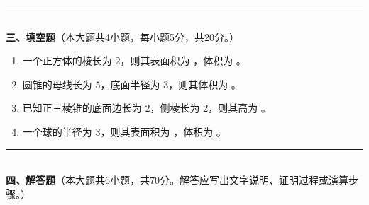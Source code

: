 \documentclass[12pt, a4paper]{ctexart}
\begin{document}
\vspace{6pt}

\noindent\rule{\textwidth}{0.4pt}\\[2pt]
{\large\bfseries 三、填空题}（本大题共4小题，每小题5分，共20分。）

\vspace{6pt}

\begin{enumerate}[resume]
\item 一个正方体的棱长为 $2$，则其表面积为 \underline{\hspace{2cm}}，体积为 \underline{\hspace{2cm}}。

\item 圆锥的母线长为 $5$，底面半径为 $3$，则其体积为 \underline{\hspace{2cm}}。

\item 已知正三棱锥的底面边长为 $2$，侧棱长为 $2$，则其高为 \underline{\hspace{2cm}}。

\item 一个球的半径为 $3$，则其表面积为 \underline{\hspace{2cm}}，体积为 \underline{\hspace{2cm}}。
\end{enumerate}

\vspace{6pt}

\noindent\rule{\textwidth}{0.4pt}\\[2pt]
{\large\bfseries 四、解答题}（本大题共6小题，共70分。解答应写出文字说明、证明过程或演算步骤。）

\vspace{6pt}
\end{document}
